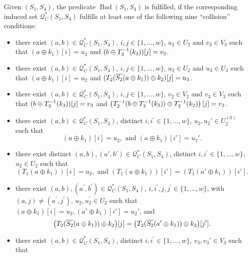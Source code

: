 \begin{definition}
	\label{defn:bad-outer-4-rounds}
	
	Given $(S_1, S_4)$, the predicate $\operatorname{Bad}\left(S_{1},S_{4}\right)$ is fulfilled, if the corresponding induced set $\mathcal{Q}_{C}^{*}\left(S_{1}, S_{4}\right)$ fulfills at least one of the following nine ``collision'' conditions:
	\begin{itemize}
		\item[\cone]
		there exist $(a, b) \in \mathcal{Q}_{C}^{*}\left(S_{1}, S_{4}\right)$, $i, j \in\{1, \ldots, w\}$, $u_{2} \in U_{2}$ and $v_{3} \in V_{3}$ such that $(a \oplus k_1)[i] = u_2$ and $(b\oplus T_{3}^{-1}(k_3))[j] = v_3$.
		\item[\ctwo]
		there exist $(a, b) \in \mathcal{Q}_{C}^{*}\left(S_{1}, S_{4}\right)$, $i, j \in\{1, \ldots, w\}$, $u_{2} \in U_{2}$ and $u_{3} \in U_{3}$ such that $(a \oplus k_1)[i] = u_2$ and $(T_{2}(\overline{S_2}(a \oplus k_1))\oplus k_2)[j] = u_3$.
		\item[\cthree]
		there exist $(a, b) \in \mathcal{Q}_{C}^{*}\left(S_{1}, S_{4}\right)$, $i, j \in\{1, \ldots, w\}$, $v_{2} \in V_{2}$ and $v_{3} \in V_{3}$ such that $(b\oplus T_{3}^{-1}(k_3))[j] = v_3$ and $\left(T_{2}^{-1}(b\oplus T_{3}^{-1}(k_3)) \oplus T_{2}^{-1}(k_2)\right)[j] = v_2$.
		\item[\cfour]
		there exist $(a, b) \in \mathcal{Q}_{C}^{*}\left(S_{1}, S_{4}\right)$, distinct $i, i^{\prime}\in\{1, \ldots, w\}$, $u_{2},u_{2}' \in U_{2}^{(0)}$ such that
		$$(a \oplus k_1)[i] = u_2,\text{ and }
		(a \oplus k_1)[i'] = u_2'.$$
		\item[\cfive]
		there exist distinct $(a, b),(a',b') \in \mathcal{Q}_{C}^{*}\left(S_{1}, S_{4}\right)$, distinct $i, i^{\prime}\in\{1, \ldots, w\}$, $u_{2} \in U_{2}$ such that
		$$\left(T_1\left(a \oplus k_{1}\right)\right)[i] = u_2,\text{ and }
		\left(T_1\left(a \oplus k_{1}\right)\right)[i'] = \left(T_1\left(a' \oplus k_{1}\right)\right)[i'].$$
		\item[\csix]
		there exist $(a, b), (a^{\prime}, b^{\prime}) \in \mathcal{Q}_{C}^{*}\left(S_{1}, S_{4}\right)$, $i, i^{\prime},j, j^{\prime} \in\{1, \ldots, w\}$, with $(a, j) \neq \left(a^{\prime}, j^{\prime}\right)$, $u_{2}, u_{2}^{\prime} \in U_{2}$ such that $(a \oplus k_1)[i] = u_2, (a' \oplus k_1)[i'] = u_2'$, and
		$$\big(T_2(\overline{S_2}(a\oplus k_1))\oplus k_2\big)[j]=\big(T_2(\overline{S_2}(a'\oplus k_1))\oplus k_2\big)[j'].
		$$
		\item[\cseven]
		there exist $(a, b) \in \mathcal{Q}_{C}^{*}\left(S_{1}, S_{4}\right)$, distinct $i, i^{\prime}\in\{1, \ldots, w\}$, $v_{3},v_{3}' \in V_{3}$ such that

\end{itemize}
\end{definition}
